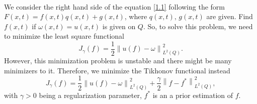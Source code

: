 \documentclass[]{article}
\begin{document}
\\
We consider the right hand side of the equation \eqref{1.1} following the form $F(x, t)=f(x, t)q(x, t)+g(x, t)$, where $q(x, t),\, g(x, t)$ are given. Find $f(x, t)$ if $\omega(x, t)=u(x, t)$ is given on $Q$. So, to solve this problem, we need to minimize the least square functional \cite{a14, a15}
$$J_{\gamma}(f)=\frac{1}{2}\left\|u(f)-\omega\right\|_{L^2(Q)}^2.$$
However, this minimization problem is unstable and there might be many minimizers to it. Therefore, we minimize the Tikhonov functional instead
$$J_{\gamma}(f)=\frac{1}{2}\left\|u(f)-\omega\right\|_{L^2(Q)}^2+\frac{\gamma}{2}\left\|f-f^*\right\|_{L^2(Q)}^2,$$
with $\gamma>0$ being a regularization parameter, $f^*$ is an a prior estimation of $f$.%
\end{document}
